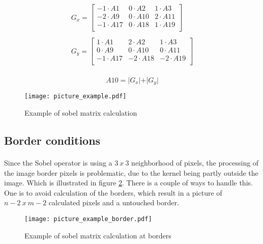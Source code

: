 \begin{equation}
\begin{array}{c}
G_x = \left[ 
\begin{array}{ccc}
	-1\cdot A1 & 0\cdot A2 & 1\cdot A3\\
    -2\cdot A9 & 0\cdot A10 & 2\cdot A11\\
    -1\cdot A17 & 0\cdot A18 & 1\cdot A19\\
\end{array} \right] \\
\\
G_y = \left[ 
\begin{array}{ccc}
	1\cdot A1 & 2\cdot A2 & 1\cdot A3\\
    0\cdot A9 & 0\cdot A10 & 0\cdot A11\\
    -1\cdot A17 & -2\cdot A18 & -2\cdot A19\\
\end{array}
\right]
\end{array}
\label{eq:sobel_calc1}
\end{equation}\\

\begin{equation}
	A10=\vert G_x\vert + \vert G_y\vert
	\label{eq:sobel_abs}
\end{equation}
 
\begin{figure}[H]
	\centering
	\texttt{[image: picture\_example.pdf]}
	\caption{Example of sobel matrix calculation}
	\label{fig:pic_matrix}
\end{figure}

\subsection{Border conditions}
\paragraph*{}
Since the Sobel operator is using a $3~x~3$ neighborhood of pixels, the processing of the image border pixels is problematic, due to the kernel being partly outside the image. Which is illustrated in figure \ref{fig:pic_matrix_border}. There is a couple of ways to handle this. One is to avoid calculation of the borders, which result in a picture of $n-2~x~m-2$ calculated pixels and a untouched border. 

\begin{figure}[H]
	\centering
	\texttt{[image: picture\_example\_border.pdf]}
	\caption{Example of sobel matrix calculation at borders}
	\label{fig:pic_matrix_border}
\end{figure}

